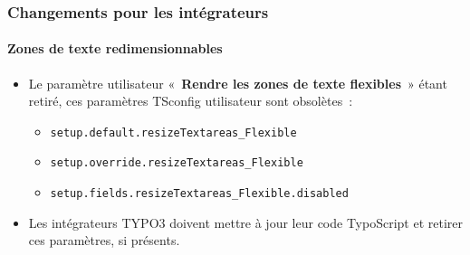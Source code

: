 %

\begin{frame}[fragile]
	\frametitle{Changements pour les intégrateurs}
	\framesubtitle{Zones de texte redimensionnables}

	\begin{itemize}
		\item Le paramètre utilisateur «~\textbf{Rendre les zones de texte flexibles}~» étant retiré,
			ces paramètres TSconfig utilisateur sont obsolètes~:

			\begin{itemize}
				\item \texttt{setup.default.resizeTextareas\_Flexible}
				\item \texttt{setup.override.resizeTextareas\_Flexible}
				\item \texttt{setup.fields.resizeTextareas\_Flexible.disabled}
			\end{itemize}

		\item Les intégrateurs TYPO3 doivent mettre à jour leur code TypoScript et retirer
			ces paramètres, si présents.

	\end{itemize}
\end{frame}

